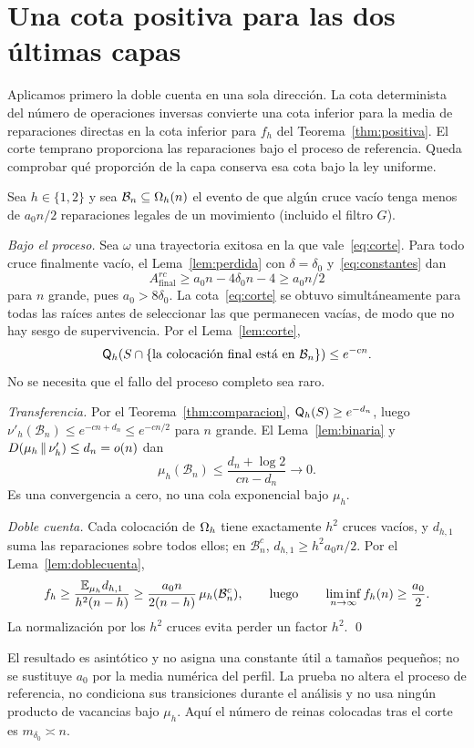 \section{Una cota positiva para las dos últimas capas}\label{sec:positiva}

Aplicamos primero la doble cuenta en una sola dirección. La cota determinista
del número de operaciones inversas convierte una cota inferior para la media de
reparaciones directas en la cota inferior para $f_h$ del Teorema~\ref{thm:positiva}.
El corte temprano proporciona las reparaciones bajo el proceso de referencia.
Queda comprobar qué proporción de la capa conserva esa cota bajo la ley uniforme.

Sea $h\in\{1,2\}$ y sea $\mathcal B_n\subseteq\Omega_h(n)$ el evento de que algún cruce vacío tenga
menos de $a_0n/2$ reparaciones legales de un movimiento (incluido el filtro $G$).

\emph{Bajo el proceso.} Sea $\omega$ una trayectoria exitosa en la que vale~\eqref{eq:corte}.
Para todo cruce finalmente vacío, el Lema~\ref{lem:perdida} con $\delta=\delta_0$ y~\eqref{eq:constantes}
dan
\[
 A^{rc}_{\mathrm{final}}\ge a_0n-4\delta_0n-4\ge a_0n/2
\]
para $n$ grande, pues $a_0>8\delta_0$. La cota~\eqref{eq:corte} se obtuvo simultáneamente para
todas las raíces antes de seleccionar las que permanecen vacías, de modo que no hay sesgo de
supervivencia. Por el Lema~\ref{lem:corte},
\[
 \mathsf{Q}_h(S\cap\{\text{la colocación final está en }\mathcal B_n\})\le e^{-cn}.
\]
No se necesita que el fallo del proceso completo sea raro.

\emph{Transferencia.} Por el Teorema~\ref{thm:comparacion}, $\mathsf{Q}_h(S)\ge e^{-d_n}$, luego
$\nu'_h(\mathcal B_n)\le e^{-cn+d_n}\le e^{-cn/2}$ para $n$ grande. El
Lema~\ref{lem:binaria} y $D(\mu_h\,\Vert\,\nu'_h)\le d_n=o(n)$ dan
\[
 \mu_h(\mathcal B_n)\le\frac{d_n+\log2}{cn-d_n}\longrightarrow0 .
\]
Es una convergencia a cero, no una cola exponencial bajo $\mu_h$.

\emph{Doble cuenta.} Cada colocación de $\Omega_h$ tiene exactamente $h^2$ cruces vacíos, y
$d_{h,1}$ suma las reparaciones sobre todos ellos; en $\mathcal B_n^c$, $d_{h,1}\ge h^2a_0n/2$. Por
el Lema~\ref{lem:doblecuenta},
\[
 f_h\ge\frac{\mathbb{E}_{\mu_h}d_{h,1}}{h^2(n-h)}\ge\frac{a_0n}{2(n-h)}\,\mu_h(\mathcal B_n^c),
 \qquad\text{luego}\qquad \liminf_{n\to\infty}f_h(n)\ge\frac{a_0}2 .
\]
La normalización por los $h^2$ cruces evita perder un factor $h^2$. \qed

\begin{observacion}
El resultado es asintótico y no asigna una constante útil a tamaños pequeños; no se sustituye
$a_0$ por la media numérica del perfil. La prueba no altera el proceso de referencia, no
condiciona sus transiciones durante el análisis y no usa ningún producto de vacancias bajo
$\mu_h$. Aquí el número de reinas colocadas tras el corte es $m_{\delta_0}\asymp n$.
\end{observacion}
